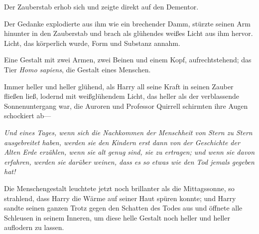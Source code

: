 Der Zauberstab erhob sich und zeigte direkt auf den Dementor.


Der Gedanke explodierte aus ihm wie ein brechender Damm, stürzte seinen Arm hinunter in den Zauberstab und brach als glühendes weißes Licht aus ihm hervor. Licht, das körperlich wurde, Form und Substanz annahm.

Eine Gestalt mit zwei Armen, zwei Beinen und einem Kopf, aufrechtstehend; das Tier \emph{Homo sapiens}, die Gestalt eines Menschen.

Immer heller und heller glühend, als Harry all seine Kraft in seinen Zauber fließen ließ, lodernd mit weißglühendem Licht, das heller als der verblassende Sonnenuntergang war, die Auroren und Professor Quirrell schirmten ihre Augen schockiert ab—

\emph{Und eines Tages, wenn sich die Nachkommen der Menschheit von Stern zu Stern ausgebreitet haben, werden sie den Kindern erst dann von der Geschichte der Alten Erde erzählen, wenn sie alt genug sind, sie zu ertragen; und wenn sie davon erfahren, werden sie darüber weinen, dass es so etwas wie den Tod jemals gegeben hat!}

Die Menschengestalt leuchtete jetzt noch brillanter als die Mittagssonne, so strahlend, dass Harry die Wärme auf seiner Haut spüren konnte; und Harry sandte seinen ganzen Trotz gegen den Schatten des Todes aus und öffnete alle Schleusen in seinem Inneren, um diese helle Gestalt noch heller und heller auflodern zu lassen.

